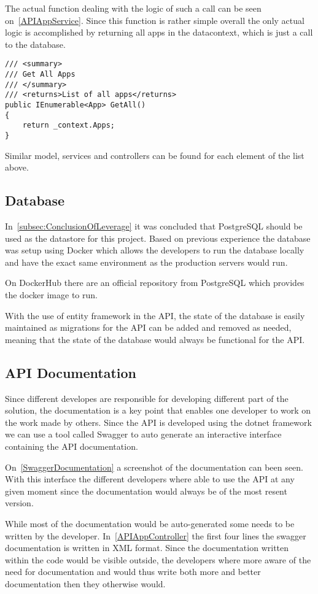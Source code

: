 The actual function dealing with the logic of such a call can be seen on~\autoref{APIAppService}.
Since this function is rather simple overall the only actual logic is accomplished by returning all apps in the datacontext, which is just a call to the database.

\begin{lstlisting}[caption={API App Controller GetAll Function}, label={APIAppService}, language={CSharp}]
/// <summary>
/// Get All Apps
/// </summary>
/// <returns>List of all apps</returns>
public IEnumerable<App> GetAll()
{
    return _context.Apps;
}
\end{lstlisting}

Similar model, services and controllers can be found for each element of the list above.

\subsection{Database}

In~\autoref{subsec:ConclusionOfLeverage} it was concluded that PostgreSQL should be used as the datastore for this project.
Based on previous experience the database was setup using Docker which allows the developers to run the database locally and have the exact same environment as the production servers would run.

On DockerHub there are an official repository from PostgreSQL which provides the docker image to run\cite{DockerHubPostgreSQL}.

With the use of entity framework in the API, the state of the database is easily maintained as migrations for the API can be added and removed as needed, meaning that the state of the database would always be functional for the API\cite{EntityFramework}.

\subsection{API Documentation}

Since different developes are responsible for developing different part of the solution, the documentation is a key point that enables one developer to work on the work made by others.
Since the API is developed using the dotnet framework we can use a tool called Swagger to auto generate an interactive interface containing the API documentation\cite{SwaggerIO}.

On~\autoref{SwaggerDocumentation} a screenshot of the documentation can been seen.
With this interface the different developers where able to use the API at any given moment since the documentation would always be of the most resent version.


While most of the documentation would be auto-generated some needs to be written by the developer.
In~\autoref{APIAppController} the first four lines the swagger documentation is written in XML format.
Since the documentation written within the code would be visible outside, the developers where more aware of the need for documentation and would thus write both more and better documentation then they otherwise would.
